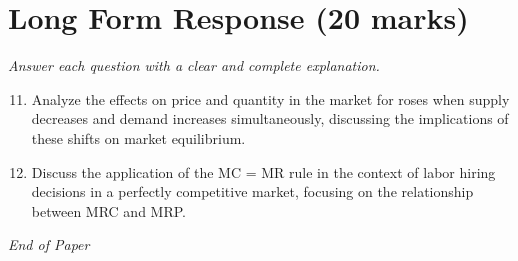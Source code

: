 \documentclass[12pt]{article}
\begin{document}
\section*{Long Form Response (20 marks)}
\textit{Answer each question with a clear and complete explanation.}
\begin{enumerate}[label=\arabic*.]
\setcounter{enumi}{10}
\item Analyze the effects on price and quantity in the market for roses when supply decreases and demand increases simultaneously, discussing the implications of these shifts on market equilibrium.
\item Discuss the application of the MC = MR rule in the context of labor hiring decisions in a perfectly competitive market, focusing on the relationship between MRC and MRP.
\end{enumerate}

\vfill
\noindent\textit{End of Paper}
\end{document}
